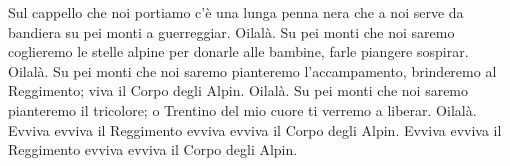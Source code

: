 \chordsoff
\beginverse
Sul cappello che noi portiamo c'è una lunga penna nera 
che a noi serve da bandiera su pei monti a guerreggiar. Oilalà.
\endverse
\beginverse
Su pei monti che noi saremo coglieremo le stelle alpine 
per donarle alle bambine, farle piangere sospirar. Oilalà.
\endverse
\beginverse
Su pei monti che noi saremo pianteremo l'accampamento, 
brinderemo al Reggimento; viva il Corpo degli Alpin. Oilalà.
\endverse
\beginverse
Su pei monti che noi saremo pianteremo il tricolore; 
o Trentino del mio cuore ti verremo a liberar. Oilalà.
\endverse
\beginverse
Evviva evviva il Reggimento evviva evviva il Corpo degli Alpin.
Evviva evviva il Reggimento evviva evviva il Corpo degli Alpin.
\endverse
\endsong

